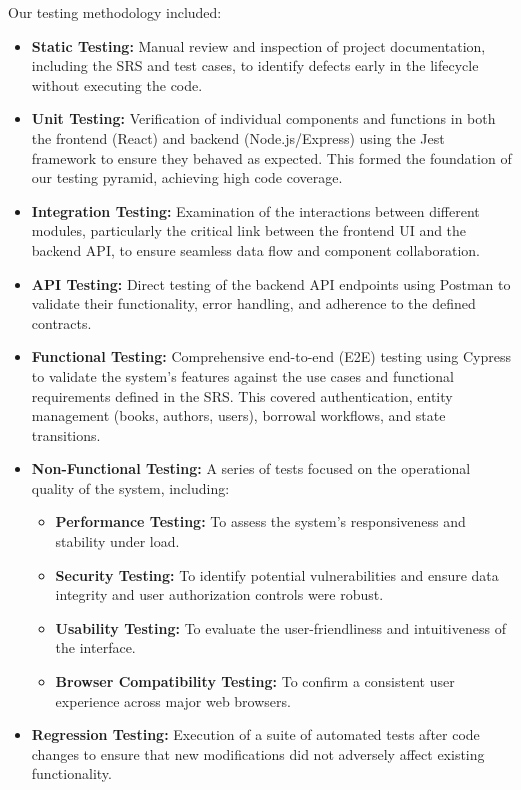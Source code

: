 Our testing methodology included:
\begin{itemize}
    \item \textbf{Static Testing:} Manual review and inspection of project documentation, including the SRS and test cases, to identify defects early in the lifecycle without executing the code.
    \item \textbf{Unit Testing:} Verification of individual components and functions in both the frontend (React) and backend (Node.js/Express) using the Jest framework to ensure they behaved as expected. This formed the foundation of our testing pyramid, achieving high code coverage.
    \item \textbf{Integration Testing:} Examination of the interactions between different modules, particularly the critical link between the frontend UI and the backend API, to ensure seamless data flow and component collaboration.
    \item \textbf{API Testing:} Direct testing of the backend API endpoints using Postman to validate their functionality, error handling, and adherence to the defined contracts.
    \item \textbf{Functional Testing:} Comprehensive end-to-end (E2E) testing using Cypress to validate the system's features against the use cases and functional requirements defined in the SRS. This covered authentication, entity management (books, authors, users), borrowal workflows, and state transitions.
    \item \textbf{Non-Functional Testing:} A series of tests focused on the operational quality of the system, including:
    \begin{itemize}
        \item \textbf{Performance Testing:} To assess the system's responsiveness and stability under load.
        \item \textbf{Security Testing:} To identify potential vulnerabilities and ensure data integrity and user authorization controls were robust.
        \item \textbf{Usability Testing:} To evaluate the user-friendliness and intuitiveness of the interface.
        \item \textbf{Browser Compatibility Testing:} To confirm a consistent user experience across major web browsers.
    \end{itemize}
    \item \textbf{Regression Testing:} Execution of a suite of automated tests after code changes to ensure that new modifications did not adversely affect existing functionality.
\end{itemize}

